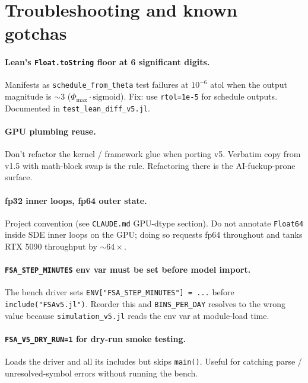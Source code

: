 \documentclass[11pt,a4paper]{article}
\begin{document}
\section{Troubleshooting and known gotchas}
\label{sec:trouble}

\paragraph{Lean's \texttt{Float.toString} floor at 6 significant
digits.} Manifests as \texttt{schedule\_from\_theta} test failures
at $10^{-6}$ atol when the output magnitude is $\sim 3$
($\Phi_{\max} \cdot \mathrm{sigmoid}$). Fix: use \texttt{rtol=1e-5}
for schedule outputs. Documented in \texttt{test\_lean\_diff\_v5.jl}.

\paragraph{GPU plumbing reuse.} Don't refactor the kernel /
framework glue when porting v5. Verbatim copy from v1.5 with
math-block swap is the rule. Refactoring there is the
AI-fuckup-prone surface.

\paragraph{fp32 inner loops, fp64 outer state.} Project convention
(see \texttt{CLAUDE.md} GPU-dtype section). Do not annotate
\texttt{Float64} inside SDE inner loops on the GPU; doing so
requests fp64 throughout and tanks RTX 5090 throughput by
$\sim 64\times$.

\paragraph{\texttt{FSA\_STEP\_MINUTES} env var must be set before
model import.} The bench driver sets
\texttt{ENV["FSA\_STEP\_MINUTES"] = ...} before
\texttt{include("FSAv5.jl")}. Reorder this and \texttt{BINS\_PER\_DAY}
resolves to the wrong value because \texttt{simulation\_v5.jl}
reads the env var at module-load time.

\paragraph{\texttt{FSA\_V5\_DRY\_RUN=1} for dry-run smoke testing.}
Loads the driver and all its includes but skips \texttt{main()}.
Useful for catching parse / unresolved-symbol errors without
running the bench.
\end{document}
